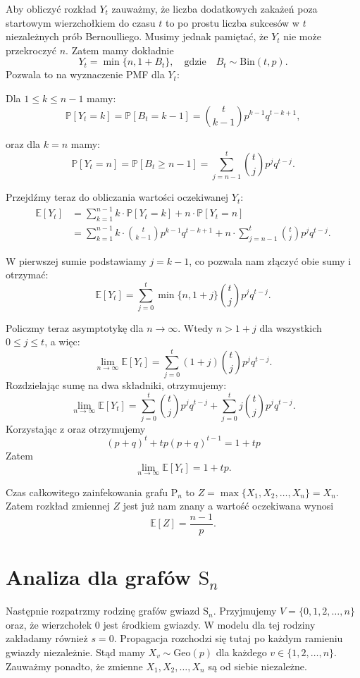 Aby obliczyć rozkład $Y_t$ zauważmy, że liczba dodatkowych zakażeń poza startowym wierzchołkiem do czasu $t$ to po prostu liczba sukcesów w $t$ niezależnych prób Bernoulliego. Musimy jednak pamiętać, że $Y_t$ nie może przekroczyć $n$. Zatem mamy dokładnie
\[
Y_t = \min\{n, 1 + B_t\}, \quad \text{gdzie} \quad B_t \sim \mathrm{Bin}(t,p).
\]
Pozwala to na wyznaczenie PMF dla $Y_t$:

Dla $1 \le k \le n-1$ mamy:
\[
\mathbb{P}[Y_t=k] = \mathbb{P}[B_t=k-1] = \binom{t}{k-1} p^{k-1} q^{t-k+1},
\]  

oraz dla $k = n$ mamy:
\[
\mathbb{P}[Y_t=n] = \mathbb{P}[B_t \ge n-1] = \sum_{j=n-1}^{t} \binom{t}{j} p^j q^{t-j}.
\]

Przejdźmy teraz do obliczania wartości oczekiwanej $Y_t$:
\begin{align*}
\mathbb{E}[Y_t] 
&= \sum_{k=1}^{n-1} k \cdot \mathbb{P}[Y_t=k] + n \cdot \mathbb{P}[Y_t=n] \\
&= \sum_{k=1}^{n-1} k \cdot \binom{t}{k-1} p^{k-1} q^{t-k+1} 
   + n \cdot \sum_{j=n-1}^{t} \binom{t}{j} p^j q^{t-j}.
\end{align*}

W pierwszej sumie podstawiamy $j = k-1$, co pozwala nam złączyć obie sumy i otrzymać:
\[
    \mathbb{E}[Y_t] = \sum_{j=0}^{t} \min\{n, 1+j\} \binom{t}{j} p^j q^{t-j}.
\]

Policzmy teraz asymptotykę dla $n \to \infty$. Wtedy $n > 1 + j$ dla wszystkich $0 \le j \le t$, a więc:
\[
    \lim_{n \to \infty}\mathbb{E}[Y_t] = \sum_{j=0}^{t} (1+j) \binom{t}{j} p^j q^{t-j}.
\]
Rozdzielając sumę na dwa składniki, otrzymujemy:
\[
    \lim_{n \to \infty}\mathbb{E}[Y_t] = \sum_{j=0}^{t} \binom{t}{j} p^j q^{t-j} 
+ \sum_{j=0}^{t} j \binom{t}{j} p^j q^{t-j}.
\]
Korzystając z  oraz  otrzymujemy
\[
    (p+q)^t+tp(p+q)^{t-1}=1+tp
\]
Zatem
\[
    \lim_{n \to \infty}\mathbb{E}[Y_t] = 1+tp.
\]

Czas całkowitego zainfekowania grafu $\mathrm{P}_n$ to $Z = \max\{X_1,X_2,\dots,X_n\} = X_n$. Zatem rozkład zmiennej $Z$ jest już nam znany a wartość oczekiwana wynosi 
\[
    \mathbb{E}[Z]=\frac{n-1}{p}.
\]


\section{Analiza dla grafów $\mathrm{S}_n$}

Następnie rozpatrzmy rodzinę grafów gwiazd $\mathrm{S}_n$. Przyjmujemy $V=\{0,1,2,\dots,n\}$ oraz, że wierzchołek $0$ jest środkiem gwiazdy. W modelu dla tej rodziny zakładamy również $s=0$. Propagacja rozchodzi się tutaj po każdym ramieniu gwiazdy niezależnie. 
Stąd mamy $X_v \sim \mathrm{Geo}(p)$ dla każdego $v\in\{1,2,\dots,n\}$. Zauważmy ponadto, że zmienne $X_1,X_2,\dots,X_n$ są od siebie niezależne.\\

